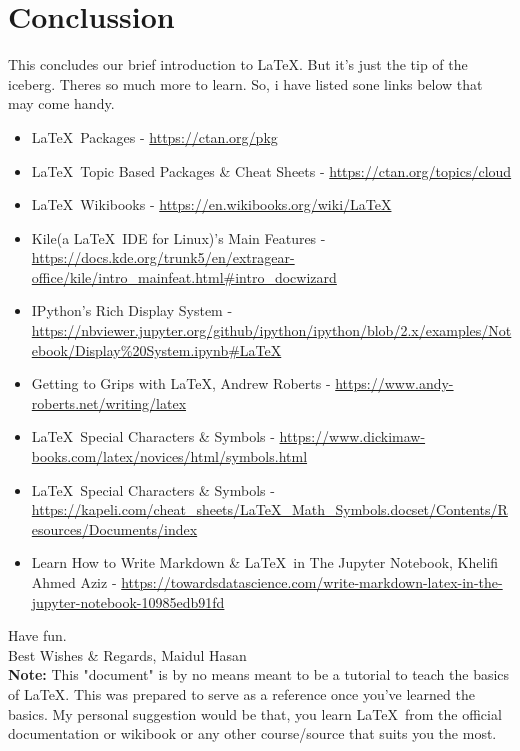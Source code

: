 \documentclass[12pt, twocolumn]{article}
\begin{document}
 \section{Conclussion}
 This concludes our brief introduction to \LaTeX. But it's just the tip of the iceberg. Theres so much more to learn. So, i have listed sone links below that may come handy. \\
 
 \begin{itemize}
  \item \LaTeX\ Packages - \url{https://ctan.org/pkg}
  \item \LaTeX\ Topic Based Packages \& Cheat Sheets - \url{https://ctan.org/topics/cloud}
  \item \LaTeX\ Wikibooks - \url{https://en.wikibooks.org/wiki/LaTeX}
  \item Kile(a \LaTeX\ IDE for Linux)'s Main Features - \url{https://docs.kde.org/trunk5/en/extragear-office/kile/intro_mainfeat.html#intro_docwizard}
  \item IPython's Rich Display System - \url{https://nbviewer.jupyter.org/github/ipython/ipython/blob/2.x/examples/Notebook/Display%20System.ipynb#LaTeX}
  \item Getting to Grips with \LaTeX, Andrew Roberts - \url{https://www.andy-roberts.net/writing/latex}
  \item \LaTeX\ Special Characters \& Symbols - \url{https://www.dickimaw-books.com/latex/novices/html/symbols.html}
  \item \LaTeX\ Special Characters \& Symbols - \url{https://kapeli.com/cheat_sheets/LaTeX_Math_Symbols.docset/Contents/Resources/Documents/index}
  \item Learn How to Write Markdown \& \LaTeX\ in The Jupyter Notebook, Khelifi Ahmed Aziz - \url{https://towardsdatascience.com/write-markdown-latex-in-the-jupyter-notebook-10985edb91fd}
 \end{itemize} 
 
 \noindent Have fun. \\ Best Wishes \& Regards, Maidul Hasan \\
 
 \noindent \textbf{Note:} 
This "document" is by no means meant to be a tutorial to teach the basics of \LaTeX. This was prepared to serve as a reference once you've learned the basics. My personal suggestion would be that, you learn \LaTeX\ from the official documentation or wikibook or any other course/source that suits you the most.
 
  
 
\end{document}
